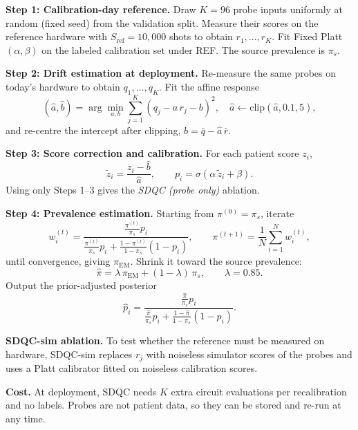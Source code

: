 \documentclass[conference]{IEEEtran}
\begin{document}
\textbf{Step 1: Calibration-day reference.} Draw $K=96$ probe inputs uniformly at random (fixed seed) from the validation split. Measure their scores on the reference hardware with $S_{\mathrm{ref}}=10{,}000$ shots to obtain $r_1,\dots,r_K$. Fit Fixed Platt $(\alpha,\beta)$ on the labeled calibration set under REF. The source prevalence is $\pi_s$.

\textbf{Step 2: Drift estimation at deployment.} Re-measure the same probes on today's hardware to obtain $q_1,\dots,q_K$. Fit the affine response
\begin{equation}
(\hat a,\hat b)=\arg\min_{a,b}\sum_{j=1}^{K}\left(q_j-a\,r_j-b\right)^2,\quad \hat a\leftarrow\mathrm{clip}(\hat a,0.1,5),
\end{equation}
and re-centre the intercept after clipping, $\hat b=\bar q-\hat a\,\bar r$.

\textbf{Step 3: Score correction and calibration.} For each patient score $z_i$,
\begin{equation}
\tilde z_i=\frac{z_i-\hat b}{\hat a},\qquad p_i=\sigma(\alpha\,\tilde z_i+\beta).
\end{equation}
Using only Steps 1--3 gives the \emph{SDQC (probe only)} ablation.

\textbf{Step 4: Prevalence estimation.} Starting from $\pi^{(0)}=\pi_s$, iterate
\begin{equation}
w_i^{(t)}=\frac{\frac{\pi^{(t)}}{\pi_s}p_i}{\frac{\pi^{(t)}}{\pi_s}p_i+\frac{1-\pi^{(t)}}{1-\pi_s}(1-p_i)},\qquad
\pi^{(t+1)}=\frac1N\sum_{i=1}^N w_i^{(t)},
\end{equation}
until convergence, giving $\pi_{\mathrm{EM}}$. Shrink it toward the source prevalence:
\begin{equation}
\hat\pi=\lambda\,\pi_{\mathrm{EM}}+(1-\lambda)\,\pi_s,\qquad \lambda=0.85.
\end{equation}
Output the prior-adjusted posterior
\begin{equation}
\hat p_i=\frac{\frac{\hat\pi}{\pi_s}p_i}{\frac{\hat\pi}{\pi_s}p_i+\frac{1-\hat\pi}{1-\pi_s}(1-p_i)}.
\end{equation}

\textbf{SDQC-sim ablation.} To test whether the reference must be measured on hardware, SDQC-sim replaces $r_j$ with noiseless simulator scores of the probes and uses a Platt calibrator fitted on noiseless calibration scores.

\textbf{Cost.} At deployment, SDQC needs $K$ extra circuit evaluations per recalibration and no labels. Probes are not patient data, so they can be stored and re-run at any time.
\end{document}
